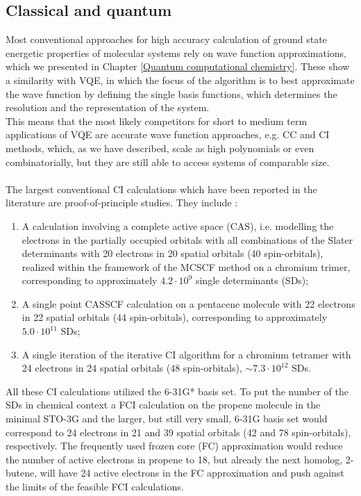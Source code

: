 \subsection{Classical and quantum}
Most conventional approaches for high accuracy calculation of ground state energetic properties of molecular systems rely on wave function approximations, which we presented in Chapter \ref{Quantum computational chemistry}. These show a similarity with VQE, in which the focus of the algorithm is to best approximate the wave function by defining the single basis functions, which determines the resolution and the representation of the system. \\
This means that the most likely competitors for short to medium term applications of VQE are accurate wave function approaches, e.g. CC and CI methods, which, as we have described, scale as high polynomials or even combinatorially, but they are still able to access systems of comparable size. \\
\\
The largest conventional CI calculations which have been reported in the literature are proof-of-principle studies. They include \cite{Elfving2020Sep}:
\begin{enumerate}
    \item A calculation involving a complete active space (CAS), i.e. modelling the electrons in the partially occupied orbitals with all combinations of the Slater determinants with 20 electrons in 20 spatial orbitals (40 spin-orbitals), realized within the framework of the MCSCF method on a chromium trimer, corresponding to approximately $4.2 \cdot 10^9$ single determinants (SDs);
    
    \item A single point CASSCF calculation on a pentacene molecule with 22 electrons in 22 spatial orbitals (44 spin-orbitals), corresponding to approximately $5.0 \cdot 10^{11}$ SDs;
    
    \item A single iteration of the iterative CI algorithm for a chromium tetramer with 24 electrons in 24 spatial orbitals (48 spin-orbitals), $\sim 7.3 \cdot 10^{12}$ SDs.
\end{enumerate}
All these CI calculations utilized the 6-31G* basis set. To put the number of the SDs in chemical context a FCI calculation on the propene molecule in the minimal STO-3G and the larger, but still very small, 6-31G basis set would correspond to 24 electrons in 21 and 39 spatial orbitals (42 and 78 spin-orbitals), respectively. The frequently used frozen core (FC) approximation would reduce the number of active electrons in propene to 18, but already the next homolog, 2-butene, will have 24 active electrons in the FC approximation and push against the limits of the feasible FCI calculations. \\
